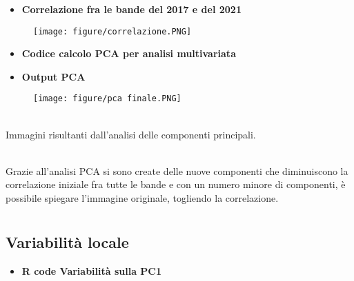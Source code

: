 \documentclass[10pt]{beamer}
\begin{document}
\begin{frame} {}
   \begin{itemize}
     \item \textbf{Correlazione fra le bande del 2017 e del 2021}
   \end{itemize}
   \begin{figure}
      \bigskip 
      \texttt{[image: figure/correlazione.PNG]}
   \end{figure}
\end{frame}    


\begin{frame} {}
   \begin{itemize}
     \item \textbf{Codice calcolo PCA per analisi multivariata}
   \end{itemize}
   \begin{mybox}
     \tiny
    \end{mybox}
\end{frame}    


\begin{frame} {}
    \begin{itemize}
      \item \textbf{Output PCA}
    \end{itemize}
    \begin{figure}
      \bigskip 
      \centering
      \texttt{[image: figure/pca finale.PNG]}
    \end{figure}
    \centering
    {\\Immagini risultanti dall'analisi delle componenti principali. \par}
    
     \bigskip
    {\\Grazie all'analisi PCA si sono create delle nuove componenti che diminuiscono la correlazione iniziale
    fra tutte le bande e con un numero minore di componenti, è possibile spiegare l'immagine originale, togliendo la correlazione.\par}
\end{frame}    


\section {}
\subsection {Variabilità locale}
\begin{frame} 
    \begin{itemize}
      \item \textbf{R code Variabilità sulla PC1}
    \end{itemize}
    \begin{mybox}
      \tiny
    \end{mybox}
\end{frame}
\end{document}
